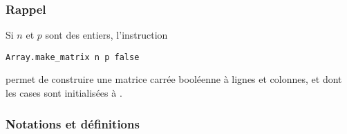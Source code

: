 \subsubsection*{Rappel}
Si $n$ et $p$ sont des entiers, l'instruction
\begin{lstlisting}
Array.make_matrix n p false
\end{lstlisting}
permet de construire une matrice carrée booléenne  à  lignes et  colonnes, et dont les cases sont initialisées à . 
\subsubsection*{Notations et définitions}

